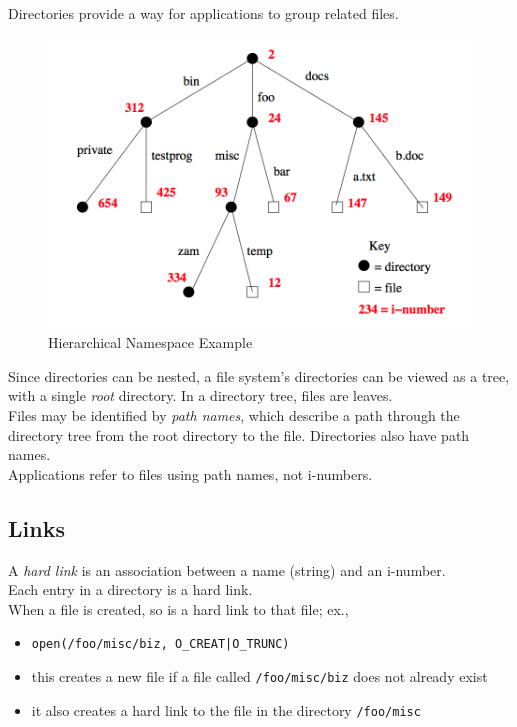 \documentclass[12pt]{article}
\theoremstyle{plain}
\theoremstyle{definition}
\begin{document}
Directories provide a way for applications to group related files.

\begin{figure}[H]
  \vspace{-15pt}
  \centering
  \includegraphics[scale=0.7]{pictures/directory_tree.png}
  \caption{Hierarchical Namespace Example}
  \label{fig:dir_tree_ex}
\end{figure}
Since directories can be nested, a file system's directories can be viewed as a tree, with a single \emph{root} directory.
In a directory tree, files are leaves. \\
Files may be identified by \emph{path names}, which describe a path through the directory tree from the root directory to the file.
Directories also have path names. \\
Applications refer to files using path names, not i-numbers.

\subsection{Links}
A \emph{hard link} is an association between a name (string) and an i-number. \\
Each entry in a directory is a hard link. \\

When a file is created, so is a hard link to that file; ex.,
\begin{itemize}
  \item \texttt{open(/foo/misc/biz, O\_CREAT|O\_TRUNC)}
  \item this creates a new file if a file called \texttt{/foo/misc/biz} does not already exist
  \item it also creates a hard link to the file in the directory \texttt{/foo/misc}
\end{itemize}
\end{document}
